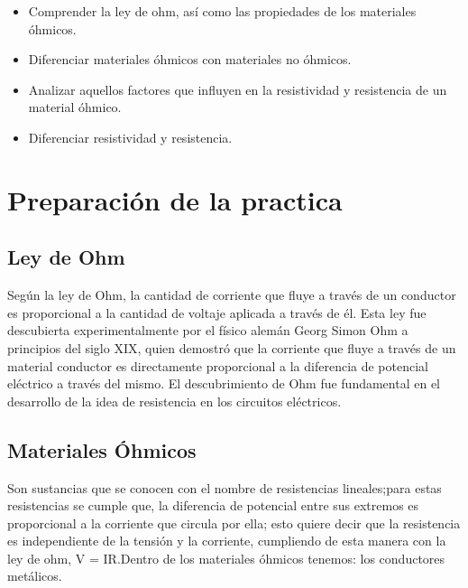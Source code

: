 \documentclass[letterpaper, 12pt]{report}
\begin{document}
\begin{itemize}
	\item Comprender la ley de ohm, así como las propiedades de los materiales 
		  óhmicos.
	\item Diferenciar materiales óhmicos con materiales no óhmicos.
	\item Analizar aquellos factores que influyen en la resistividad y 
		  resistencia de un material óhmico.
	\item Diferenciar resistividad y resistencia.
\end{itemize}



\newpage

\section{Preparación de la practica}

\subsection{Ley de Ohm}

Según la ley de Ohm, la cantidad de corriente que fluye a través de un
conductor es proporcional a la cantidad de voltaje aplicada a través de
él. Esta ley fue descubierta experimentalmente por el físico alemán Georg
Simon Ohm a principios del siglo XIX, quien demostró que la corriente que
fluye a través de un material conductor es directamente proporcional a la
diferencia de potencial eléctrico a través del mismo. El descubrimiento de
Ohm fue fundamental en el desarrollo de la idea de resistencia en los
circuitos eléctricos.~\cite{LeyDeOhm}

\subsection{Materiales Óhmicos}

Son sustancias que se conocen con el nombre de resistencias lineales;para estas
resistencias se cumple que, la diferencia de potencial entre sus extremos es
proporcional a la corriente que circula por ella; esto quiere decir que la
resistencia es independiente de la tensión y la corriente, cumpliendo de esta
manera con la ley de ohm, V = IR.\@ Dentro de los materiales óhmicos tenemos:
los conductores metálicos.~\cite{MaterialesOhmicos}
\end{document}
